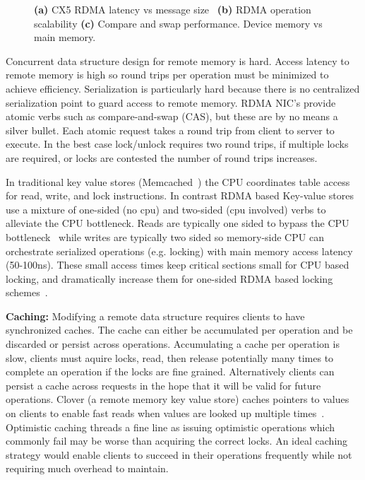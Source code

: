 \begin{figure}[t]
\begin{subfigure}{0.3\linewidth}
    \end{subfigure}
    \vspace{-1em}
    \caption{
    \textbf{(a)} CX5 RDMA latency vs message size~\cite{rdma-latency}
    \textbf{(b)} RDMA operation scalability
    \textbf{(c)} Compare and swap performance. Device memory vs main memory.
    }
    \label{fig:problems}
\end{figure}

Concurrent data structure design for remote memory is hard.
Access latency to remote memory is high so round trips per
operation must be minimized to achieve efficiency.
Serialization is particularly hard because there is no
centralized serialization point to guard access to remote
memory. RDMA NIC's provide atomic verbs such as
compare-and-swap (CAS), but these are by no means a silver
bullet.  Each atomic request takes a round trip from client
to server to execute. In the best case lock/unlock requires
two round trips, if multiple locks are required, or locks
are contested the number of round trips increases.

In traditional key value stores (Memcached~\cite{memcached})
the CPU coordinates table access for read, write, and lock
instructions. In contrast RDMA based Key-value
stores~\cite{herd,erpc,pilaf} use a mixture of one-sided (no
cpu) and two-sided (cpu involved) verbs to alleviate the CPU
bottleneck. Reads are typically one sided to bypass the CPU
bottleneck~\cite{pilaf,cell} while writes are typically two
sided so memory-side CPU can orchestrate serialized
operations (e.g. locking) with main memory access latency
(50-100ns).  These small access times keep critical sections
small for CPU based locking, and dramatically increase them
for one-sided RDMA based locking schemes~\cite{clover,
sherman}.

\textbf{Caching:} Modifying a remote data structure requires
clients to have synchronized caches. The cache can either be
accumulated per operation and be discarded or persist across
operations.  Accumulating a cache per operation is slow,
clients must aquire locks, read, then release potentially
many times to complete an operation if the locks are fine
grained. Alternatively clients can persist a cache across
requests in the hope that it will be valid for future
operations.  Clover (a remote memory key value store) caches
pointers to values on clients to enable fast reads when
values are looked up multiple times~\cite{clover}.
Optimistic caching threads a fine line as issuing optimistic
operations which commonly fail may be worse than acquiring
the correct locks.  An ideal caching strategy would enable
clients to succeed in their operations frequently while not
requiring much overhead to maintain. 



